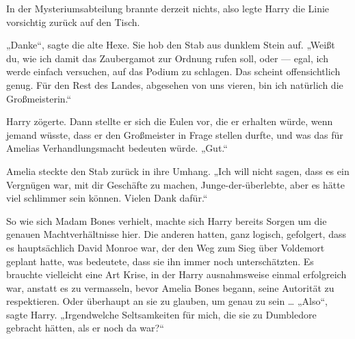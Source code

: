 In der Mysteriumsabteilung brannte derzeit nichts, also legte Harry die Linie vorsichtig zurück auf den Tisch.

„Danke“, sagte die alte Hexe. Sie hob den Stab aus dunklem Stein auf.
„Weißt du, wie ich damit das Zaubergamot zur Ordnung rufen soll, oder — egal, ich werde einfach versuchen, auf das Podium zu schlagen. Das scheint offensichtlich genug. Für den Rest des Landes, abgesehen von uns vieren, bin ich natürlich die Großmeisterin.“

Harry zögerte. Dann stellte er sich die Eulen vor, die er erhalten würde, wenn jemand wüsste, dass er den Großmeister in Frage stellen durfte, und was das für Amelias Verhandlungsmacht bedeuten würde.
„Gut.“

Amelia steckte den Stab zurück in ihre Umhang.
„Ich will nicht sagen, dass es ein Vergnügen war, mit dir Geschäfte zu machen, Junge-der-überlebte, aber es hätte viel schlimmer sein können. Vielen Dank dafür.“

So wie sich Madam Bones verhielt, machte sich Harry bereits Sorgen um die genauen Machtverhältnisse hier. Die anderen hatten, ganz logisch, gefolgert, dass es hauptsächlich David Monroe war, der den Weg zum Sieg über Voldemort geplant hatte, was bedeutete, dass sie ihn immer noch unterschätzten. Es brauchte vielleicht eine Art Krise, in der Harry ausnahmsweise einmal erfolgreich war, anstatt es zu vermasseln, bevor Amelia Bones begann, seine Autorität zu respektieren. Oder überhaupt an sie zu glauben, um genau zu sein …
„Also“, sagte Harry.
„Irgendwelche Seltsamkeiten für mich, die sie zu Dumbledore gebracht hätten, als er noch da war?“

